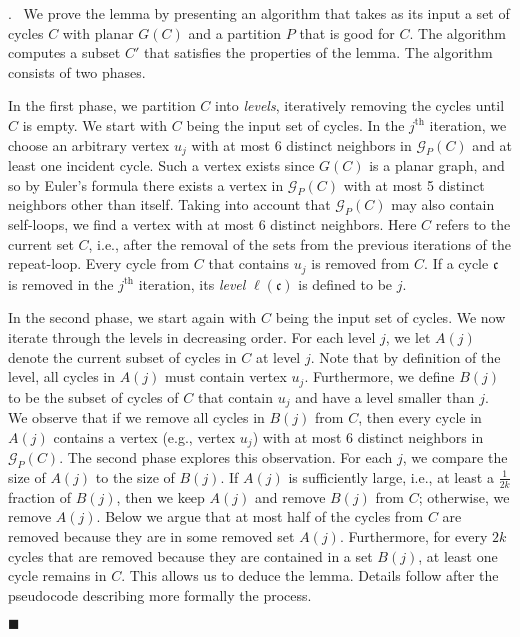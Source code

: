 \documentclass[11pt]{article}
\newenvironment{proof}{\noindent {\bf Proof}.\ }{\qed \par\vskip 4mm\par}
\newcommand{\sq}{\hbox{\rlap{$\sqcap$}$\sqcup$}}
\newcommand{\qed}{\hspace*{\fill}\sq}
\renewcommand{\qed}{\hspace*{\fill}\ensuremath{\blacksquare}}
\begin{document}
\begin{proof}
We prove the lemma by presenting an algorithm that takes as its input a set of cycles $C$ with planar $G(C)$ and a partition $P$ that is good for $C$. The algorithm computes a subset $C'$ that satisfies the properties of the lemma. The algorithm consists of two phases.

In the first phase, we partition $C$ into \emph{levels}, iteratively removing the cycles until $C$ is empty. We start with $C$ being the input set of cycles. In the $j^{\text{th}}$ iteration, we choose an arbitrary vertex $u_j$ with at most 6 distinct neighbors in $\mathcal G_P(C)$ and at least one incident cycle. Such a vertex exists since $G(C)$ is a planar graph, and so by Euler's formula there exists a vertex in
{$\mathcal G_P(C)$}
with at most 5 distinct neighbors other than itself. Taking into account that
{$\mathcal G_P(C)$}
may also contain self-loops, we find a vertex with at most 6 distinct neighbors. Here $C$ refers to the current set $C$, i.e., after the removal of the sets from the previous iterations of the repeat-loop. Every cycle from $C$ that contains $u_j$ is removed from $C$. If a cycle $\mathfrak{c}$ is removed in the $j^{\text{th}}$ iteration, its \emph{level} $\ell(\mathfrak{c})$ is defined to be $j$.

In the second phase, we start again with $C$ being the input set of cycles. We now iterate through the levels in decreasing order. For each level $j$, we let $A(j)$ denote the current subset of cycles in $C$ at level $j$. Note that by definition of the level, all cycles in $A(j)$ must contain vertex $u_j$. Furthermore, we define $B(j)$ to be the subset of cycles of $C$ that contain $u_j$ and have a level smaller than $j$. We observe that if we remove all cycles in $B(j)$ from $C$, then every cycle in $A(j)$ contains a vertex (e.g., vertex $u_j$) with at most 6 distinct neighbors in $\mathcal G_P(C)$. The second phase explores this observation. For each $j$, we compare the size of $A(j)$ to the size of $B(j)$. If $A(j)$ is sufficiently large, i.e., at least a $\frac{1}{2k}$ fraction of $B(j)$, then we keep $A(j)$ and remove $B(j)$ from $C$; otherwise, we remove $A(j)$. Below we argue that at most half of the cycles from $C$ are removed because they are in some removed set $A(j)$. Furthermore, for every $2k$ cycles that are removed because they are contained in a set $B(j)$, at least one cycle remains in $C$. This allows us to deduce the lemma. Details follow after the pseudocode describing more formally the process.


\end{proof}
\end{document}
